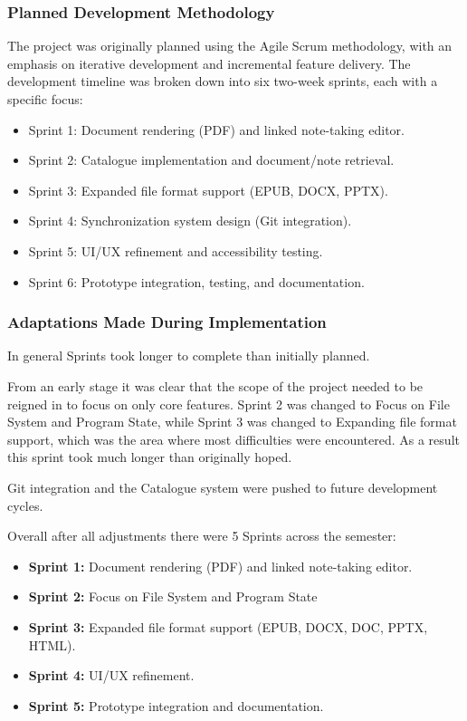 \subsubsection{Planned Development Methodology}
The project was originally planned using the Agile Scrum methodology, with an emphasis on iterative development and incremental feature delivery. The development timeline was broken down into six two-week sprints, each with a specific focus:

\begin{itemize}
    \item Sprint 1: Document rendering (PDF) and linked note-taking editor.
    \item Sprint 2: Catalogue implementation and document/note retrieval.
    \item Sprint 3: Expanded file format support (EPUB, DOCX, PPTX).
    \item Sprint 4: Synchronization system design (Git integration).
    \item Sprint 5: UI/UX refinement and accessibility testing.
    \item Sprint 6: Prototype integration, testing, and documentation.
\end{itemize}

\subsubsection{Adaptations Made During Implementation}
In general Sprints took longer to complete than initially planned. 

From an early stage it was clear that the scope of the project needed to be reigned in to focus on only core features. Sprint 2 was changed to Focus on File System and Program State, while Sprint 3 was changed to Expanding file format support, which was the area where most difficulties were encountered. As a result this sprint took much longer than originally hoped. 

Git integration and the Catalogue system were pushed to future development cycles. 

Overall after all adjustments there were 5 Sprints across the semester: 

\begin{itemize}
    \item \textbf{Sprint 1:} Document rendering (PDF) and linked note-taking editor.
    \item \textbf{Sprint 2:} Focus on File System and Program State
    \item \textbf{Sprint 3:} Expanded file format support (EPUB, DOCX, DOC, PPTX, HTML).
    \item \textbf{Sprint 4:} UI/UX refinement.
    \item \textbf{Sprint 5:} Prototype integration and documentation.
\end{itemize}

